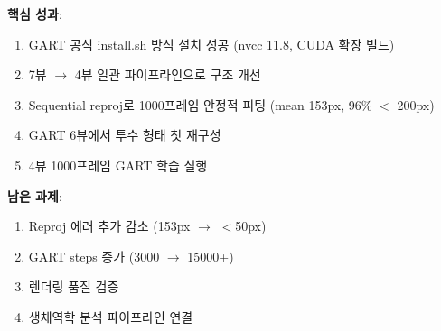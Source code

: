 \documentclass[11pt, a4paper]{report}
\begin{document}
\begin{summary}
\textbf{핵심 성과}:
\begin{enumerate}[leftmargin=*]
  \item GART 공식 install.sh 방식 설치 성공 (nvcc 11.8, CUDA 확장 빌드)
  \item 7뷰 $\rightarrow$ 4뷰 일관 파이프라인으로 구조 개선
  \item Sequential reproj로 1000프레임 안정적 피팅 (mean 153px, 96\% $<$ 200px)
  \item GART 6뷰에서 투수 형태 첫 재구성
  \item 4뷰 1000프레임 GART 학습 실행
\end{enumerate}

\textbf{남은 과제}:
\begin{enumerate}[leftmargin=*]
  \item Reproj 에러 추가 감소 (153px $\rightarrow$ $<$50px)
  \item GART steps 증가 (3000 $\rightarrow$ 15000+)
  \item 렌더링 품질 검증
  \item 생체역학 분석 파이프라인 연결
\end{enumerate}
\end{summary}
\end{document}
